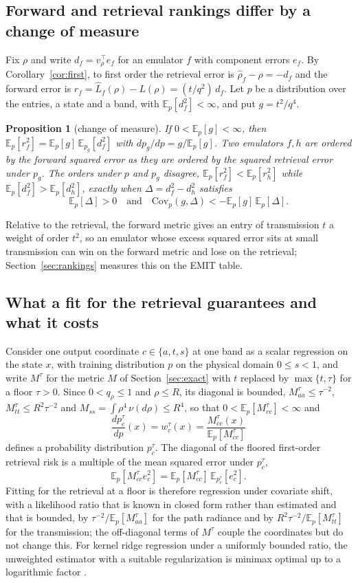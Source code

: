 \documentclass[11pt]{article}
\newtheorem{proposition}[lemma]{Proposition}
\theoremstyle{remark}
\newcommand{\E}{\mathbb{E}}
\newcommand{\1}{\mathbf{1}}
\begin{document}
\subsection{Forward and retrieval rankings differ by a change of measure}\label{sec:measure}

Fix $\rho$ and write $d_f=v_\rho^\top e_f$ for an emulator $f$ with component errors $e_f$. By
Corollary~\ref{cor:first}, to first order the retrieval error is $\hat\rho_f-\rho=-d_f$ and the forward error is
$r_f=\hat L_f(\rho)-L(\rho)=(t/q^2)\,d_f$. Let $p$ be a distribution over the entries, a state and a band, with
$\E_p[d_f^2]<\infty$, and put $g=t^2/q^4$.

\begin{proposition}[change of measure]\label{prop:measure}
If $0<\E_p[g]<\infty$, then $\E_p[r_f^2]=\E_p[g]\,\E_{p_g}[d_f^2]$ with $dp_g/dp=g/\E_p[g]$. Two emulators $f,h$ are
ordered by the forward squared error as they are ordered by the squared retrieval error under $p_g$. The orders under
$p$ and $p_g$ disagree, $\E_p[r_f^2]<\E_p[r_h^2]$ while $\E_p[d_f^2]>\E_p[d_h^2]$, exactly when $\Delta=d_f^2-d_h^2$
satisfies
\[
\E_p[\Delta]>0\quad\text{and}\quad \mathrm{Cov}_p(g,\Delta)<-\E_p[g]\,\E_p[\Delta].
\]
\end{proposition}

Relative to the retrieval, the forward metric gives an entry of transmission $t$ a weight of order $t^2$, so an
emulator whose excess squared error sits at small transmission can win on the forward metric and lose on the
retrieval; Section~\ref{sec:rankings} measures this on the EMIT table.

\subsection{What a fit for the retrieval guarantees and what it costs}\label{sec:training}

Consider one output coordinate $c\in\{a,t,s\}$ at one band as a scalar regression on the state $x$, with training
distribution $p$ on the physical domain $0\le s<1$, and write $M^\tau$ for the metric $M$ of Section~\ref{sec:exact}
with $t$ replaced by $\max\{t,\tau\}$ for a floor $\tau>0$. Since $0<q_\rho\le1$ and $\rho\le R$, its diagonal is
bounded, $M^\tau_{aa}\le\tau^{-2}$, $M^\tau_{tt}\le R^2\tau^{-2}$ and $M_{ss}=\int\rho^4\,\nu(d\rho)\le R^4$, so that
$0<\E_p[M^\tau_{cc}]<\infty$ and
\[
\frac{dp^\tau_c}{dp}(x)=w^\tau_c(x)=\frac{M^\tau_{cc}(x)}{\E_p[M^\tau_{cc}]}
\]
defines a probability distribution $p^\tau_c$. The diagonal of the floored first-order retrieval risk is a multiple
of the mean squared error under $p^\tau_c$,
\[
\E_p[M^\tau_{cc}e_c^2]=\E_p[M^\tau_{cc}]\,\E_{p^\tau_c}[e_c^2].
\]
Fitting for the
retrieval at a floor is therefore regression under covariate shift, with a likelihood ratio that is known in closed
form rather than estimated and that is bounded, by $\tau^{-2}/\E_p[M^\tau_{aa}]$ for the path radiance and by
$R^2\tau^{-2}/\E_p[M^\tau_{tt}]$ for the transmission; the off-diagonal terms of $M^\tau$ couple the coordinates but do
not change this. For kernel ridge regression under a uniformly bounded ratio, the unweighted estimator with a suitable
regularization is minimax optimal up to a logarithmic factor \cite{mpw}.
\end{document}
